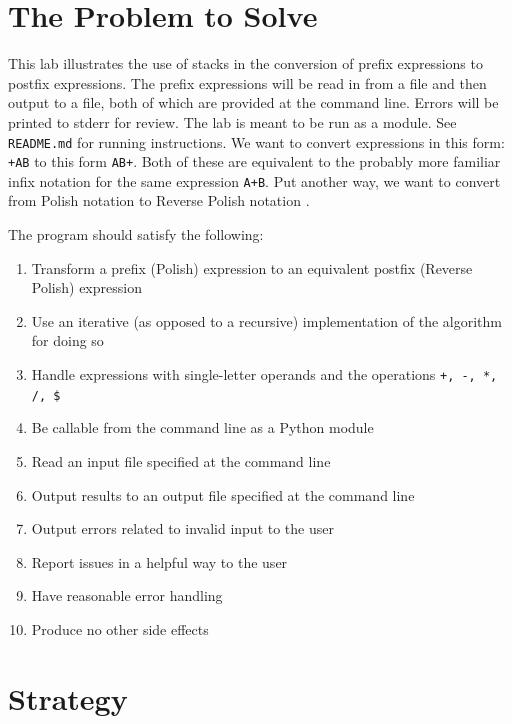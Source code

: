 \documentclass[10pt,letterpaper,final]{report}
\begin{document}
\tableofcontents

\pagebreak

\section{The Problem to Solve}

This lab illustrates the use of stacks in the conversion of prefix expressions to postfix expressions. The prefix expressions will be read in from a file and then output to a file, both of which are provided at the command line. Errors will be printed to stderr for review. The lab is meant to be run as a module. See \texttt{README.md} for running instructions.
We want to convert expressions in this form: \texttt{+AB} to this form \texttt{AB+}. Both of these are equivalent to the probably more familiar infix notation for the same expression \texttt{A+B}. Put another way, we want to convert from Polish notation to Reverse Polish notation \parencite{EnWikipediaorgReversePolishNotation}.

The program should satisfy the following:

\begin{enumerate}
  \item Transform a prefix (Polish) expression to an equivalent postfix (Reverse Polish) expression
  \item Use an iterative (as opposed to a recursive) implementation of the algorithm for doing so
  \item Handle expressions with single-letter operands and the operations \verb|+, -, *, /, $|
  \item Be callable from the command line as a Python module
  \item Read an input file specified at the command line
  \item Output results to an output file specified at the command line
  \item Output errors related to invalid input to the user
  \item Report issues in a helpful way to the user
  \item Have reasonable error handling
  \item Produce no other side effects
\end{enumerate}

\section{Strategy}\label{sec:strategy}
\end{document}
